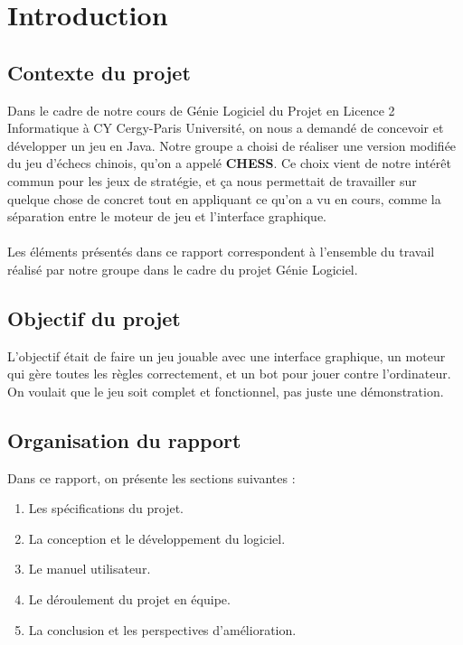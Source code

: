 \newpage
\section{Introduction}
\label{sec:introduction}
\subsection{Contexte du projet}
Dans le cadre de notre cours de Génie Logiciel du Projet en Licence 2 Informatique à CY Cergy-Paris Université, on nous a demandé de concevoir et développer un jeu en Java. Notre groupe a choisi de réaliser une version modifiée du jeu d'échecs chinois, qu'on a appelé \textbf{CHESS}. Ce choix vient de notre intérêt commun pour les jeux de stratégie, et ça nous permettait de travailler sur quelque chose de concret tout en appliquant ce qu'on a vu en cours, comme la séparation entre le moteur de jeu et l'interface graphique.
\paragraph{} Les éléments présentés dans ce rapport correspondent à l'ensemble du travail réalisé par notre groupe dans le cadre du projet Génie Logiciel.
\subsection{Objectif du projet}
L'objectif était de faire un jeu jouable avec une interface graphique, un moteur qui gère toutes les règles correctement, et un bot pour jouer contre l'ordinateur. On voulait que le jeu soit complet et fonctionnel, pas juste une démonstration.
\subsection{Organisation du rapport}
Dans ce rapport, on présente les sections suivantes :
\begin{enumerate}
\item Les spécifications du projet.
\item La conception et le développement du logiciel.
\item Le manuel utilisateur.
\item Le déroulement du projet en équipe.
\item La conclusion et les perspectives d'amélioration.
\end{enumerate}
